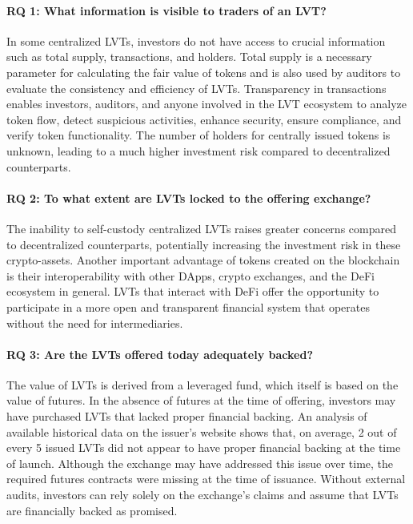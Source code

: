 \paragraph{RQ 1: What information is visible to traders of an LVT?} In some centralized LVTs, investors do not have access to crucial information such as total supply, transactions, and holders. Total supply is a necessary parameter for calculating the fair value of tokens and is also used by auditors to evaluate the consistency and efficiency of LVTs. Transparency in transactions enables investors, auditors, and anyone involved in the LVT ecosystem to analyze token flow, detect suspicious activities, enhance security, ensure compliance, and verify token functionality. The number of holders for centrally issued tokens is unknown, leading to a much higher investment risk compared to decentralized counterparts.

\paragraph{RQ 2: To what extent are LVTs locked to the offering exchange?} The inability to self-custody centralized LVTs raises greater concerns compared to decentralized counterparts, potentially increasing the investment risk in these crypto-assets. Another important advantage of tokens created on the blockchain is their interoperability with other DApps, crypto exchanges, and the DeFi ecosystem in general. LVTs that interact with DeFi offer the opportunity to participate in a more open and transparent financial system that operates without the need for intermediaries.
	
\paragraph{RQ 3: Are the LVTs offered today adequately backed?} The value of LVTs is derived from a leveraged fund, which itself is based on the value of futures. In the absence of futures at the time of offering, investors may have purchased LVTs that lacked proper financial backing. An analysis of available historical data on the issuer's website shows that, on average, 2 out of every 5 issued LVTs did not appear to have proper financial backing at the time of launch. Although the exchange may have addressed this issue over time, the required futures contracts were missing at the time of issuance. Without external audits, investors can rely solely on the exchange's claims and assume that LVTs are financially backed as promised.
	
